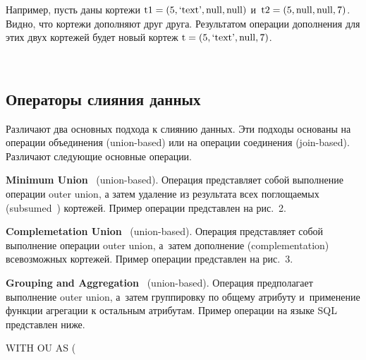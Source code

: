 \begin{multicols}{2}
  Например, пусть даны кортежи $\mathrm{t1} \hm= (5, \mbox{`text'}, \mathrm{null},
\mathrm{null})$ и~$\mathrm{t2} \hm= (5, \mathrm{null}, \mathrm{null}, 7)$. Видно, что кортежи
дополняют друг друга. Результатом операции дополнения для этих двух кортежей будет
новый кортеж $\mathrm{t} \hm= (5, \mbox{`text'}, \mathrm{null}, 7)$.


  \begin{figure*} %
  \vspace*{1pt}
 \begin{center}
 \mbox{%
 \epsfxsize=120.997mm
 }
 \end{center}
 \vspace*{-7pt}
   \vspace*{3pt}
  \end{figure*}

\vspace*{-6pt}

  \subsection{Операторы слияния данных}

  Различают два основных подхода к слиянию данных. Эти подходы основаны на операции
объединения (union-based) или на операции соединения (join-based). Различают следующие
основные операции.

  \textbf{Minimum Union}~\cite{11-vov} (union-based). Операция представляет собой
выполнение операции {\sf outer union}, а затем удаление из результата всех
поглощаемых (subsumed~\cite{11-vov}) кортежей. Пример операции представлен на рис.~2.


  \textbf{Complemetation Union}~\cite{11-vov} (union-based). Операция
представляет собой выполнение операции {\sf outer union}, а~затем дополнение
(complementation) всевозможных кортежей. Пример операции представлен на рис.~3.



  \textbf{Grouping and Aggregation}~\cite{11-vov} (union-based). Операция
предполагает выполнение {\sf outer union}, а~затем группировку по общему атрибуту
и~применение функции агрегации к остальным атрибутам. Пример операции на языке SQL
представлен ниже.
\smallskip

\noindent
{\sf   WITH OU AS ( }

\noindent
\hspace*{3pt}{\sf   (SELECT A, B, C, NULL AS D FROM U1)}


\end{multicols}
